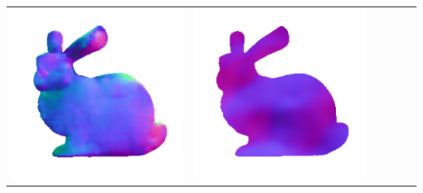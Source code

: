 \begin{tabularx}{\linewidth}{@{}Y@{}Y@{}Y@{}Y@{}Y@{}Y@{}}
\includegraphics[width=\linewidth]{semisynthetic/20150514_14_marrnet_out.png} &
\includegraphics[width=\linewidth]{semisynthetic/20150514_14_ef_out.png} \\

\end{tabularx}
